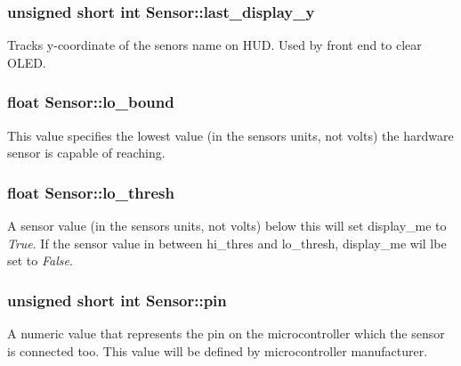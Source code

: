 \subsubsection[{\texorpdfstring{last\+\_\+display\+\_\+y}{last_display_y}}]{\setlength{\rightskip}{0pt plus 5cm}unsigned short int Sensor\+::last\+\_\+display\+\_\+y}\hypertarget{classSensor_abd9a9623b38fb1b096f8d6d83479a843}{}\label{classSensor_abd9a9623b38fb1b096f8d6d83479a843}
Tracks y-\/coordinate of the senor\textquotesingle{}s name on H\+UD. Used by front end to clear O\+L\+ED. 
\subsubsection[{\texorpdfstring{lo\+\_\+bound}{lo_bound}}]{\setlength{\rightskip}{0pt plus 5cm}float Sensor\+::lo\+\_\+bound}\hypertarget{classSensor_a911ac4a3ab38cb07cd9452c1cdb1b77e}{}\label{classSensor_a911ac4a3ab38cb07cd9452c1cdb1b77e}
This value specifies the lowest value (in the sensor\textquotesingle{}s units, not volts) the hardware sensor is capable of reaching. 
\subsubsection[{\texorpdfstring{lo\+\_\+thresh}{lo_thresh}}]{\setlength{\rightskip}{0pt plus 5cm}float Sensor\+::lo\+\_\+thresh}\hypertarget{classSensor_a5fea9f7da15f3f88017953b01d944a4b}{}\label{classSensor_a5fea9f7da15f3f88017953b01d944a4b}
A sensor value (in the sensor\textquotesingle{}s units, not volts) below this will set display\+\_\+me to {\itshape True}. If the sensor value in between hi\+\_\+thres and lo\+\_\+thresh, display\+\_\+me wil lbe set to {\itshape False}. 
\subsubsection[{\texorpdfstring{pin}{pin}}]{\setlength{\rightskip}{0pt plus 5cm}unsigned short int Sensor\+::pin}\hypertarget{classSensor_a1533fd4f5fd1f6552141cb41c8a52240}{}\label{classSensor_a1533fd4f5fd1f6552141cb41c8a52240}
A numeric value that represents the pin on the microcontroller which the sensor is connected too. This value will be defined by microcontroller manufacturer. 
